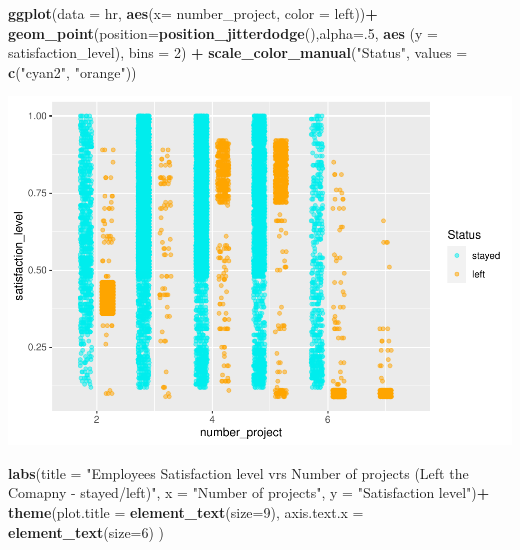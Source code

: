 \documentclass[
  11pt,
]{article}
\newenvironment{Shaded}{\begin{snugshade}}{\end{snugshade}}
\newcommand{\AttributeTok}[1]{\textcolor[rgb]{0.13,0.29,0.53}{#1}}
\newcommand{\DecValTok}[1]{\textcolor[rgb]{0.00,0.00,0.81}{#1}}
\newcommand{\FunctionTok}[1]{\textcolor[rgb]{0.13,0.29,0.53}{\textbf{#1}}}
\newcommand{\NormalTok}[1]{#1}
\newcommand{\SpecialCharTok}[1]{\textcolor[rgb]{0.81,0.36,0.00}{\textbf{#1}}}
\newcommand{\StringTok}[1]{\textcolor[rgb]{0.31,0.60,0.02}{#1}}
\begin{document}
\begin{Shaded}
\begin{Highlighting}[]
\FunctionTok{ggplot}\NormalTok{(}\AttributeTok{data =}\NormalTok{ hr, }\FunctionTok{aes}\NormalTok{(}\AttributeTok{x=}\NormalTok{ number\_project, }\AttributeTok{color =}\NormalTok{ left))}\SpecialCharTok{+}
  \FunctionTok{geom\_point}\NormalTok{(}\AttributeTok{position=}\FunctionTok{position\_jitterdodge}\NormalTok{(),}\AttributeTok{alpha=}\NormalTok{.}\DecValTok{5}\NormalTok{,}
             \FunctionTok{aes}\NormalTok{ (}\AttributeTok{y =}\NormalTok{   satisfaction\_level), }\AttributeTok{bins =} \DecValTok{2}\NormalTok{) }\SpecialCharTok{+}
  \FunctionTok{scale\_color\_manual}\NormalTok{(}\StringTok{"Status"}\NormalTok{, }\AttributeTok{values =} \FunctionTok{c}\NormalTok{(}\StringTok{"cyan2"}\NormalTok{, }\StringTok{"orange"}\NormalTok{))}
\end{Highlighting}
\end{Shaded}

\includegraphics[width=0.9\linewidth]{OWUSU_project_files/figure-latex/unnamed-chunk-8-1}

\begin{Shaded}
\begin{Highlighting}[]
   \FunctionTok{labs}\NormalTok{(}\AttributeTok{title =} 
\StringTok{"Employee\textquotesingle{}s Satisfaction level vrs Number of projects (Left the Comapny {-} stayed/left)"}\NormalTok{,}
           \AttributeTok{x =} \StringTok{"Number of projects"}\NormalTok{, }\AttributeTok{y =} \StringTok{"Satisfaction level"}\NormalTok{)}\SpecialCharTok{+}
            \FunctionTok{theme}\NormalTok{(}\AttributeTok{plot.title =} \FunctionTok{element\_text}\NormalTok{(}\AttributeTok{size=}\DecValTok{9}\NormalTok{),}
                   \AttributeTok{axis.text.x =} \FunctionTok{element\_text}\NormalTok{(}\AttributeTok{size=}\DecValTok{6}\NormalTok{) )}
\end{Highlighting}
\end{Shaded}
\end{document}
